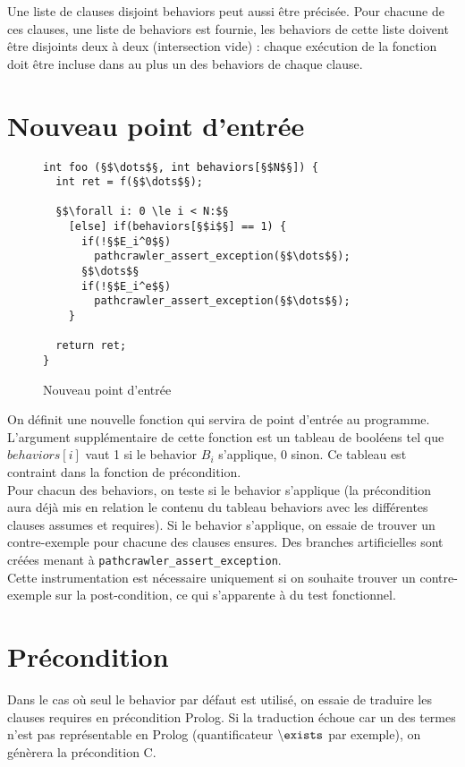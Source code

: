 Une liste de clauses disjoint behaviors peut aussi être précisée. Pour chacune
de ces clauses, une liste de behaviors est fournie, les behaviors de cette liste
doivent être disjoints deux à deux (intersection vide) : chaque exécution de la
fonction doit être incluse dans au plus un des behaviors de chaque clause.


\section{Nouveau point d'entrée}


\begin{figure}[h]
  \begin{lstlisting}
int foo (§$\dots$§, int behaviors[§$N$§]) {
  int ret = f(§$\dots$§);

  §$\forall i: 0 \le i < N:$§
    [else] if(behaviors[§$i$§] == 1) {
      if(!§$E_i^0$§)
        pathcrawler_assert_exception(§$\dots$§);
      §$\dots$§
      if(!§$E_i^e$§)
        pathcrawler_assert_exception(§$\dots$§);
    }

  return ret;
}
  \end{lstlisting}
  \caption{Nouveau point d'entrée}
\end{figure}

On définit une nouvelle fonction qui servira de point d'entrée au programme.
L'argument supplémentaire de cette fonction est un tableau de booléens tel
que $behaviors[i]$ vaut 1 si le behavior $B_i$ s'applique, 0 sinon. Ce tableau
est contraint dans la fonction de précondition.\\

Pour chacun des behaviors, on teste si le behavior s'applique (la précondition
aura déjà mis en relation le contenu du tableau behaviors avec les différentes
clauses assumes et requires). Si le behavior s'applique, on essaie de trouver un
contre-exemple pour chacune des clauses ensures. Des branches artificielles sont
créées menant à {\tt pathcrawler\_assert\_exception}.\\

Cette instrumentation est nécessaire uniquement si on souhaite trouver un
contre-exemple sur la post-condition, ce qui s'apparente à du test fonctionnel.

\section{Précondition}


Dans le cas où seul le behavior par défaut est utilisé, on essaie de traduire
les clauses requires en précondition Prolog. Si la traduction échoue car un des
termes n'est pas représentable en Prolog (quantificateur
${\tt \backslash exists}$ par exemple), on génèrera la précondition C.\\

